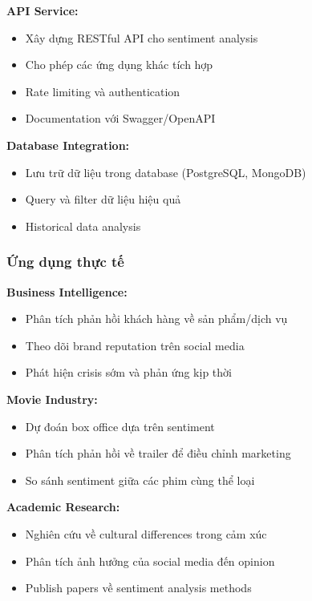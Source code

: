 \textbf{API Service:}
\begin{itemize}
    \item Xây dựng RESTful API cho sentiment analysis
    \item Cho phép các ứng dụng khác tích hợp
    \item Rate limiting và authentication
    \item Documentation với Swagger/OpenAPI
\end{itemize}

\textbf{Database Integration:}
\begin{itemize}
    \item Lưu trữ dữ liệu trong database (PostgreSQL, MongoDB)
    \item Query và filter dữ liệu hiệu quả
    \item Historical data analysis
\end{itemize}

\subsubsection{Ứng dụng thực tế}

\textbf{Business Intelligence:}
\begin{itemize}
    \item Phân tích phản hồi khách hàng về sản phẩm/dịch vụ
    \item Theo dõi brand reputation trên social media
    \item Phát hiện crisis sớm và phản ứng kịp thời
\end{itemize}

\textbf{Movie Industry:}
\begin{itemize}
    \item Dự đoán box office dựa trên sentiment
    \item Phân tích phản hồi về trailer để điều chỉnh marketing
    \item So sánh sentiment giữa các phim cùng thể loại
\end{itemize}

\textbf{Academic Research:}
\begin{itemize}
    \item Nghiên cứu về cultural differences trong cảm xúc
    \item Phân tích ảnh hưởng của social media đến opinion
    \item Publish papers về sentiment analysis methods
\end{itemize}

